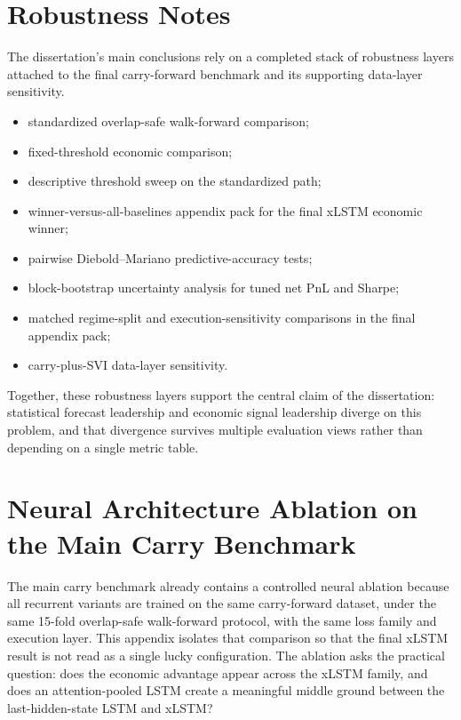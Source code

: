 \documentclass[12pt]{report}
\begin{document}
\chapter{Robustness Notes}
The dissertation's main conclusions rely on a completed stack of robustness layers attached to the final carry-forward benchmark and its supporting data-layer sensitivity.

\begin{itemize}[leftmargin=1.2cm]
    \item standardized overlap-safe walk-forward comparison;
    \item fixed-threshold economic comparison;
    \item descriptive threshold sweep on the standardized path;
    \item winner-versus-all-baselines appendix pack for the final xLSTM economic winner;
    \item pairwise Diebold--Mariano predictive-accuracy tests;
    \item block-bootstrap uncertainty analysis for tuned net PnL and Sharpe;
    \item matched regime-split and execution-sensitivity comparisons in the final appendix pack;
    \item carry-plus-SVI data-layer sensitivity.
\end{itemize}

Together, these robustness layers support the central claim of the dissertation: statistical forecast leadership and economic signal leadership diverge on this problem, and that divergence survives multiple evaluation views rather than depending on a single metric table.

\chapter{Neural Architecture Ablation on the Main Carry Benchmark}
The main carry benchmark already contains a controlled neural ablation because all recurrent variants are trained on the same carry-forward dataset, under the same 15-fold overlap-safe walk-forward protocol, with the same loss family and execution layer. This appendix isolates that comparison so that the final xLSTM result is not read as a single lucky configuration. The ablation asks the practical question: does the economic advantage appear across the xLSTM family, and does an attention-pooled LSTM create a meaningful middle ground between the last-hidden-state LSTM and xLSTM?
\end{document}

